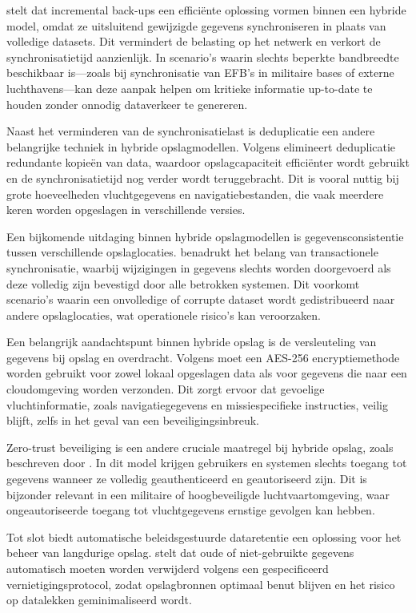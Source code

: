 \textcite{VeeamRTO} stelt dat incremental back-ups een efficiënte oplossing vormen binnen een hybride model, omdat ze uitsluitend gewijzigde gegevens synchroniseren in plaats van volledige datasets. Dit vermindert de belasting op het netwerk en verkort de synchronisatietijd aanzienlijk. In scenario’s waarin slechts beperkte bandbreedte beschikbaar is—zoals bij synchronisatie van EFB’s in militaire bases of externe luchthavens—kan deze aanpak helpen om kritieke informatie up-to-date te houden zonder onnodig dataverkeer te genereren.

Naast het verminderen van de synchronisatielast is deduplicatie een andere belangrijke techniek in hybride opslagmodellen. Volgens \textcite{Yanamala2024} elimineert deduplicatie redundante kopieën van data, waardoor opslagcapaciteit efficiënter wordt gebruikt en de synchronisatietijd nog verder wordt teruggebracht. Dit is vooral nuttig bij grote hoeveelheden vluchtgegevens en navigatiebestanden, die vaak meerdere keren worden opgeslagen in verschillende versies.

Een bijkomende uitdaging binnen hybride opslagmodellen is gegevensconsistentie tussen verschillende opslaglocaties. \textcite{EFBDataSecurity} benadrukt het belang van transactionele synchronisatie, waarbij wijzigingen in gegevens slechts worden doorgevoerd als deze volledig zijn bevestigd door alle betrokken systemen. Dit voorkomt scenario’s waarin een onvolledige of corrupte dataset wordt gedistribueerd naar andere opslaglocaties, wat operationele risico’s kan veroorzaken.

Een belangrijk aandachtspunt binnen hybride opslag is de versleuteling van gegevens bij opslag en overdracht. Volgens \textcite{NISTFIPS140} moet een AES-256 encryptiemethode worden gebruikt voor zowel lokaal opgeslagen data als voor gegevens die naar een cloudomgeving worden verzonden. Dit zorgt ervoor dat gevoelige vluchtinformatie, zoals navigatiegegevens en missiespecifieke instructies, veilig blijft, zelfs in het geval van een beveiligingsinbreuk.

Zero-trust beveiliging is een andere cruciale maatregel bij hybride opslag, zoals beschreven door \textcite{ACISAPGSECVEIL001}. In dit model krijgen gebruikers en systemen slechts toegang tot gegevens wanneer ze volledig geauthenticeerd en geautoriseerd zijn. Dit is bijzonder relevant in een militaire of hoogbeveiligde luchtvaartomgeving, waar ongeautoriseerde toegang tot vluchtgegevens ernstige gevolgen kan hebben.

Tot slot biedt automatische beleidsgestuurde dataretentie een oplossing voor het beheer van langdurige opslag. \textcite{DoD5220} stelt dat oude of niet-gebruikte gegevens automatisch moeten worden verwijderd volgens een gespecificeerd vernietigingsprotocol, zodat opslagbronnen optimaal benut blijven en het risico op datalekken geminimaliseerd wordt.
        
